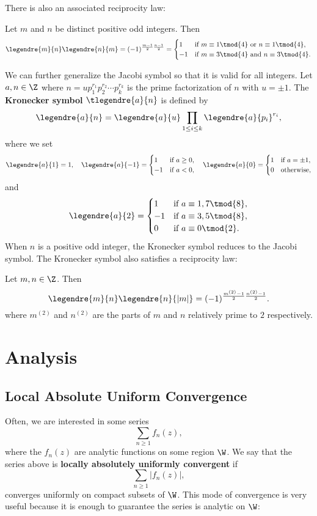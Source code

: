    There is also an associated reciprocity law:
    \begin{proposition}
      Let $m$ and $n$ be distinct positive odd integers. Then
      \[
        \legendre{m}{n}\legendre{n}{m} = (-1)^{\frac{m-1}{2}\frac{n-1}{2}} = \begin{cases} 1 & \text{if $m \equiv 1 \tmod{4}$ or $n \equiv 1 \tmod{4}$}, \\ -1 & \text{if $m \equiv 3 \tmod{4}$ and $n \equiv 3 \tmod{4}$}. \end{cases}
      \]
    \end{proposition}
    We can further generalize the Jacobi symbol so that it is valid for all integers. Let $a,n \in \Z$ where $n = up_{1}^{r_{1}}p_{2}^{r_{2}} \cdots p_{k}^{r_{k}}$ is the prime factorization of $n$ with $u = \pm1$. The \textbf{Kronecker symbol} $\tlegendre{a}{n}$ is defined by
    \[
      \legendre{a}{n} = \legendre{a}{u}\prod_{1 \le i \le k}\legendre{a}{p_{i}}^{r_{i}},
    \]
    where we set
    \[
      \legendre{a}{1} = 1, \quad \legendre{a}{-1} = \begin{cases} 1 & \text{if $a \ge 0$}, \\ -1 & \text{if $a < 0$}, \end{cases} \quad \legendre{a}{0} = \begin{cases} 1 & \text{if $a = \pm 1$}, \\ 0 & \text{otherwise}, \end{cases}
    \]
    and
    \[
      \legendre{a}{2} = \begin{cases} 1 & \text{if $a \equiv 1,7 \tmod{8}$}, \\ -1 & \text{if $a \equiv 3,5 \tmod{8}$}, \\ 0 & \text{if $a \equiv 0 \tmod{2}$}. \end{cases}
    \]
    When $n$ is a positive odd integer, the Kronecker symbol reduces to the Jacobi symbol. The Kronecker symbol also satisfies a reciprocity law:
    \begin{proposition}
      Let $m,n \in \Z$. Then
      \[
        \legendre{m}{n}\legendre{n}{|m|} = (-1)^{\frac{m^{(2)}-1}{2}\frac{n^{(2)}-1}{2}}.
      \]
      where $m^{(2)}$ and $n^{(2)}$ are the parts of $m$ and $n$ relatively prime to $2$ respectively.
    \end{proposition}
\chapter{Analysis}
  \section{Local Absolute Uniform Convergence}
    Often, we are interested in some series
    \[
      \sum_{n \ge 1}f_{n}(z),
    \]
    where the $f_{n}(z)$ are analytic functions on some region $\W$. We say that the series above is \textbf{locally absolutely uniformly convergent} if
    \[
      \sum_{n \ge 1}|f_{n}(z)|,
    \]
    converges uniformly on compact subsets of $\W$. This mode of convergence is very useful because it is enough to guarantee the series is analytic on $\W$:

